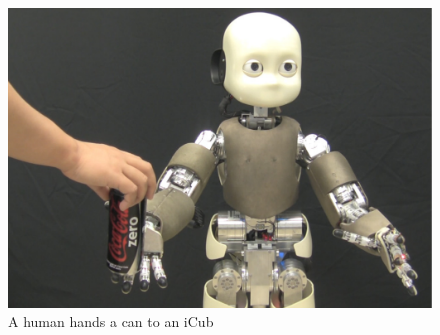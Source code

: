 \begin{figure}
  \centering
  \includegraphics[width=12cm]{./fig_cha3/handover.pdf}
  \caption{A human hands a can to an iCub}
  \label{handover}
\end{figure}












